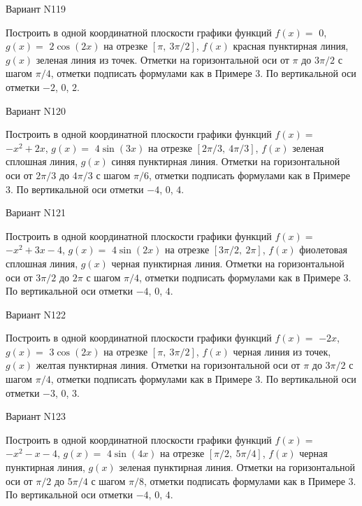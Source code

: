\documentclass[11pt]{report}
\begin{document}
Вариант N119

Построить в одной координатной плоскости графики функций $f(x) = $
    $0$, $g(x) = $
    $2 \cos{\left(2 x \right)}$ на 
    отрезке $\left[ \pi, \  3 \pi / 2\right]$, $f(x)$ красная 
    пунктирная линия, $g(x)$ зеленая линия из точек. 
    Отметки на горизонтальной оси от $\pi$ до $3 \pi / 2$ с 
    шагом $\pi / 4$, отметки подписать формулами как в Примере 3.  
    По вертикальной оси отметки $-2$, 0, $2$.

Вариант N120

Построить в одной координатной плоскости графики функций $f(x) = $
    $- x^{2} + 2 x$, $g(x) = $
    $4 \sin{\left(3 x \right)}$ на 
    отрезке $\left[ 2 \pi / 3, \  4 \pi / 3\right]$, $f(x)$ зеленая 
    сплошная линия, $g(x)$ синяя пунктирная линия. 
    Отметки на горизонтальной оси от $2 \pi / 3$ до $4 \pi / 3$ с 
    шагом $\pi / 6$, отметки подписать формулами как в Примере 3.  
    По вертикальной оси отметки $-4$, 0, $4$.

Вариант N121

Построить в одной координатной плоскости графики функций $f(x) = $
    $- x^{2} + 3 x - 4$, $g(x) = $
    $4 \sin{\left(2 x \right)}$ на 
    отрезке $\left[ 3 \pi / 2, \  2 \pi\right]$, $f(x)$ фиолетовая 
    сплошная линия, $g(x)$ черная пунктирная линия. 
    Отметки на горизонтальной оси от $3 \pi / 2$ до $2 \pi$ с 
    шагом $\pi / 4$, отметки подписать формулами как в Примере 3.  
    По вертикальной оси отметки $-4$, 0, $4$.

Вариант N122

Построить в одной координатной плоскости графики функций $f(x) = $
    $- 2 x$, $g(x) = $
    $3 \cos{\left(2 x \right)}$ на 
    отрезке $\left[ \pi, \  3 \pi / 2\right]$, $f(x)$ черная 
    линия из точек, $g(x)$ желтая пунктирная линия. 
    Отметки на горизонтальной оси от $\pi$ до $3 \pi / 2$ с 
    шагом $\pi / 4$, отметки подписать формулами как в Примере 3.  
    По вертикальной оси отметки $-3$, 0, $3$.

Вариант N123

Построить в одной координатной плоскости графики функций $f(x) = $
    $- x^{2} - x - 4$, $g(x) = $
    $4 \sin{\left(4 x \right)}$ на 
    отрезке $\left[ \pi / 2, \  5 \pi / 4\right]$, $f(x)$ черная 
    пунктирная линия, $g(x)$ зеленая пунктирная линия. 
    Отметки на горизонтальной оси от $\pi / 2$ до $5 \pi / 4$ с 
    шагом $\pi / 8$, отметки подписать формулами как в Примере 3.  
    По вертикальной оси отметки $-4$, 0, $4$.
\end{document}
